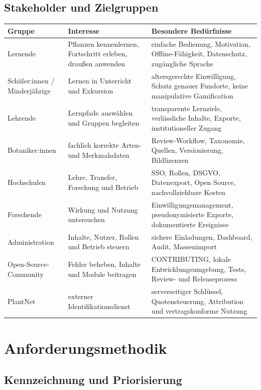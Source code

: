 \documentclass[10pt,a4paper,oneside]{article}
\begin{document}
\subsection{Stakeholder und Zielgruppen}

\begin{longtable}{@{}p{30mm}p{52mm}p{76mm}@{}}
\toprule
\textbf{Gruppe} & \textbf{Interesse} & \textbf{Besondere Bedürfnisse} \\
\midrule
\endhead
Lernende & Pflanzen kennenlernen, Fortschritt erleben, draußen anwenden & einfache Bedienung, Motivation, Offline-Fähigkeit, Datenschutz, zugängliche Sprache \\
Schüler:innen / Minderjährige & Lernen in Unterricht und Exkursion & altersgerechte Einwilligung, Schutz genauer Fundorte, keine manipulative Gamification \\
Lehrende & Lernpfade auswählen und Gruppen begleiten & transparente Lernziele, verlässliche Inhalte, Exporte, institutioneller Zugang \\
Botaniker:innen & fachlich korrekte Arten- und Merkmalsdaten & Review-Workflow, Taxonomie, Quellen, Versionierung, Bildlizenzen \\
Hochschulen & Lehre, Transfer, Forschung und Betrieb & SSO, Rollen, DSGVO, Datenexport, Open Source, nachvollziehbare Kosten \\
Forschende & Wirkung und Nutzung untersuchen & Einwilligungsmanagement, pseudonymisierte Exporte, dokumentierte Ereignisse \\
Administration & Inhalte, Nutzer, Rollen und Betrieb steuern & sichere Einladungen, Dashboard, Audit, Massenimport \\
Open-Source-Community & Fehler beheben, Inhalte und Module beitragen & CONTRIBUTING, lokale Entwicklungsumgebung, Tests, Review- und Releaseprozess \\
PlantNet & externer Identifikationsdienst & serverseitiger Schlüssel, Quotensteuerung, Attribution und vertragskonforme Nutzung \\
\bottomrule
\end{longtable}

\section{Anforderungsmethodik}

\subsection{Kennzeichnung und Priorisierung}
\end{document}

